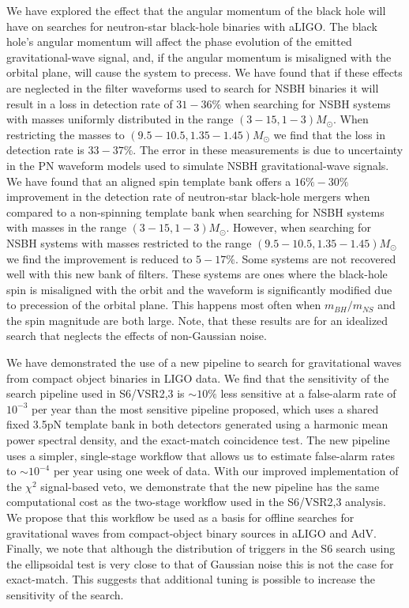 We have explored the effect that the angular momentum of the black
hole will have on searches for neutron-star black-hole binaries with
\ac{aLIGO}. The black hole's angular momentum will affect the phase evolution
of the emitted gravitational-wave signal, and, if the angular momentum is
misaligned with the orbital plane, will cause the system to precess. We have
found that if these effects are neglected in the filter waveforms used to
search for \ac{NSBH} binaries it will result in a loss in detection rate of
$31-36\%$ when searching for \ac{NSBH} systems with masses uniformly 
distributed in the range 
$(3-15,1-3)M_{\odot}$. When restricting the masses to 
$(9.5-10.5,1.35-1.45)M_{\odot}$ we find that the loss in detection rate is
$33 - 37\%$. The error in these measurements is due to uncertainty in 
the \ac{PN} waveform models used to simulate \ac{NSBH} gravitational-wave 
signals. We have found that an aligned spin template bank offers a
$16\%-30\%$ improvement in the detection rate of neutron-star black-hole
mergers when compared to a non-spinning template bank when searching for 
\ac{NSBH} systems with masses in the range $(3-15,1-3)M_{\odot}$. However, when
searching for \ac{NSBH} systems with masses restricted to the range 
$(9.5-10.5,1.35-1.45)M_{\odot}$ we find the improvement is reduced to $5-17\%$.
Some systems are not recovered well with this new bank of filters. These systems
are ones where the black-hole spin is misaligned with the orbit and the waveform
is significantly modified due to precession of the orbital plane. This happens
most often when $m_{BH} / m_{NS}$ and the spin magnitude are both large. Note, 
that these results are for an idealized search that neglects the effects
of non-Gaussian noise.

We have demonstrated the use of a new pipeline to search for gravitational
waves from compact object binaries in LIGO data. We find that the sensitivity of the search
pipeline used in S6/VSR2,3 is $\sim 10\%$ less sensitive at a false-alarm rate of $10^{-3}$ per year than the most sensitive
pipeline proposed, which uses a shared fixed 3.5pN template bank in both detectors generated using 
a harmonic mean power spectral density, and the exact-match coincidence test.  
The new pipeline uses a simpler, single-stage workflow that allows us to
estimate false-alarm rates to $\sim 10^{-4}$ per year using one week of data. With our improved
implementation of the $\chi^2$ signal-based veto, we demonstrate that the new
pipeline has the same computational cost as the two-stage workflow used in the S6/VSR2,3
analysis. We propose that this workflow be used as a basis for offline
searches for gravitational waves from compact-object binary sources in aLIGO
and AdV. Finally, we note that although the distribution of triggers 
in the S6 search using the ellipsoidal test is very close to that of Gaussian noise this is not the case
for exact-match. This suggests that additional tuning is possible to increase
the sensitivity of the search. 

